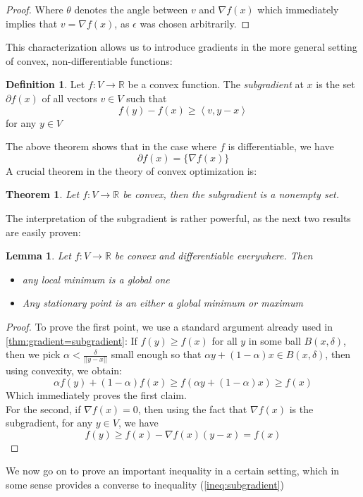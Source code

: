 \documentclass{book}
\theoremstyle{plain}
\newtheorem{theorem}[corollary]{Theorem}
\newtheorem{lemma}[corollary]{Lemma}
\theoremstyle{definition}
\newtheorem{definition}[corollary]{Definition}
\newcommand{\bl}[2]{\left\langle #1,#2\right\rangle}
\renewcommand{\d}[1]{\mathbb{#1}}
\newcommand{\mor}{\longrightarrow}
\begin{document}
\begin{proof}
Where $\theta$ denotes the angle between $v$ and $\nabla f(x)$ which immediately implies that $v=\nabla f(x)$, as $\epsilon$ was chosen arbitrarily.
\end{proof}

\noindent This characterization allows us to introduce gradients in the more general setting of convex, non-differentiable functions:
\begin{definition}
Let $f:V\mor \d{R}$ be a convex function. The \emph{subgradient} at $x$ is the set $\partial f(x)$ of all vectors $v \in V$ such that 
\[
f(y)-f(x)\ge \bl{v}{ y-x}
\]	
for any $y \in V$
\end{definition}

\noindent The above theorem shows that in the case where $f$ is differentiable, we have
\[
\partial f(x)=\{\nabla f(x)\}
\]
A crucial theorem in the theory of convex optimization is:
\begin{theorem}
Let $f:V \mor \d{R}$ be convex, then the subgradient is a nonempty set.	
\end{theorem}

\noindent The interpretation of the subgradient is rather powerful, as the next two results are easily proven:
\begin{lemma}\label{lem:stationary_point=global_minimum}
Let $f:V\mor \d{R}$ be convex and differentiable everywhere. Then
\begin{itemize}
\item any local minimum is a global one
\item Any stationary point is an either a global minimum or maximum	
\end{itemize}
\end{lemma}

\begin{proof}
To prove the first point, we use a standard argument already used in \ref{thm:gradient=subgradient}:
If $f(y)\ge f(x)$ for all $y$ in some ball $B(x,\delta)$, then we pick $\alpha<\frac{\delta}{\vert \vert y-x \vert\vert }$ small enough so that $\alpha y+(1-\alpha)x \in B(x,\delta)$, then using convexity, we obtain:
\[
\alpha f(y)+(1-\alpha)f(x)\ge f(\alpha y+(1-\alpha)x)\ge f(x)
\]
Which immediately proves the first claim.\\
\noindent For the second, if $\nabla f(x)=0$, then using the fact that $\nabla f(x)$ is the subgradient, for any $y \in V$, we have
\[
f(y)\ge f(x)-\nabla f(x)(y-x)=f(x)
\]
\end{proof}

We now  go on to prove an important inequality in a certain setting, which in some sense provides a converse to inequality (\ref{ineq:subgradient})
\end{document}
